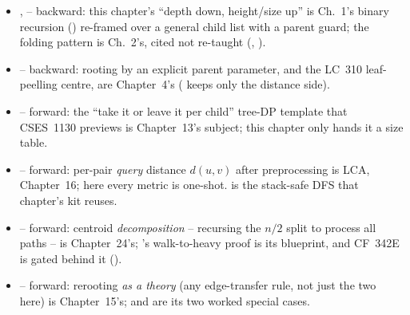 
\begin{itemize}[nosep, leftmargin=1.4em]
  \item {},  -- backward: this chapter's ``depth down, height/size up'' is
        Ch.~1's binary recursion () re-framed over a general child
        list with a parent guard; the folding pattern is Ch.~2's, cited not re-taught
        (, ).
  \item {} -- backward: rooting by an explicit parent parameter, and the LC~310
        leaf-peelling centre, are Chapter~4's ( keeps only the distance side).
  \item {} -- forward: the ``take it or leave it per child'' tree-DP template that
        CSES~1130 previews is Chapter~13's subject; this chapter only hands it a size table.
  \item {} -- forward: per-pair \emph{query} distance $d(u,v)$ after preprocessing is
        LCA, Chapter~16; here every metric is one-shot.  is the stack-safe
        DFS that chapter's kit reuses.
  \item {} -- forward: centroid \emph{decomposition} -- recursing the $n/2$ split to
        process all paths -- is Chapter~24's; 's walk-to-heavy proof is
        its blueprint, and CF~342E is gated behind it ().
  \item {} -- forward: rerooting \emph{as a theory} (any edge-transfer rule, not just
        the two here) is Chapter~15's;  and  are its
        two worked special cases.
\end{itemize}

